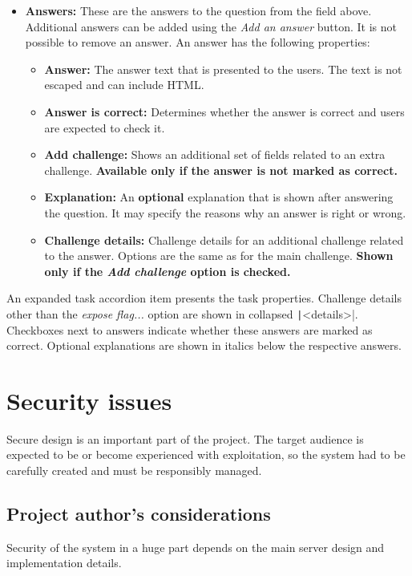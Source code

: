 \begin{itemize}
    \item \textbf{Answers:} These are the answers to the question from the field above. Additional answers can be added using the \textit{Add an answer} button. It is not possible to remove an answer. An answer has the following properties:
    \begin{itemize}
        \item \textbf{Answer:} The answer text that is presented to the users. The text is not escaped and can include HTML.
        \item \textbf{Answer is correct:} Determines whether the answer is correct and users are expected to check it.
        \item \textbf{Add challenge:} Shows an additional set of fields related to an extra challenge. \textbf{Available only if the answer is not marked as correct.}
        \item \textbf{Explanation:} An \textbf{optional} explanation that is shown after answering the question. It may specify the reasons why an answer is right or wrong.
        \item \textbf{Challenge details:} Challenge details for an additional challenge related to the answer. Options are the same as for the main challenge. \textbf{Shown only if the \textit{Add challenge} option is checked.}
    \end{itemize}
\end{itemize}

An expanded task accordion item presents the task properties. Challenge details other than the \textit{expose flag...} option are shown in collapsed \texttt|<details>|. Checkboxes next to answers indicate whether these answers are marked as correct. Optional explanations are shown in italics below the respective answers.

\section{Security issues}

Secure design is an important part of the project. The target audience is expected to be or become experienced with exploitation, so the system had to be carefully created and must be responsibly managed.

\subsection{Project author's considerations}

Security of the system in a huge part depends on the main server design and implementation details.

